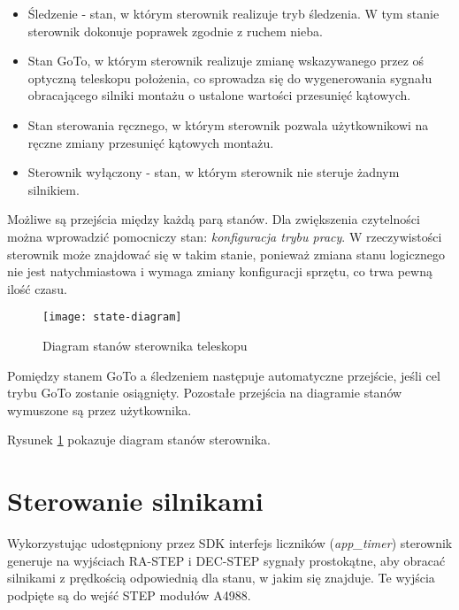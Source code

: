 \begin{itemize}

	\item Śledzenie - stan, w którym sterownik realizuje tryb śledzenia.
		W tym stanie sterownik dokonuje poprawek zgodnie z ruchem nieba.

	\item Stan GoTo, w którym sterownik realizuje zmianę wskazywanego przez
		oś optyczną teleskopu położenia, co sprowadza się do
		wygenerowania sygnału obracającego silniki montażu o ustalone
		wartości przesunięć kątowych.

	\item Stan sterowania ręcznego, w którym sterownik pozwala użytkownikowi
		na ręczne zmiany przesunięć kątowych montażu. 

	\item Sterownik wyłączony - stan, w którym sterownik nie steruje żadnym
		silnikiem.

\end{itemize}

Możliwe są przejścia między każdą parą stanów. Dla zwiększenia czytelności można
wprowadzić pomocniczy stan: \emph{konfiguracja trybu pracy}.  W rzeczywistości
sterownik może znajdować się w takim stanie, ponieważ zmiana stanu logicznego
nie jest natychmiastowa i wymaga zmiany konfiguracji sprzętu, co trwa pewną
ilość czasu.

\begin{figure}

	\texttt{[image: state-diagram]}

	\caption{Diagram stanów sterownika teleskopu}
	
	\label{rys:state-diagram}

\end{figure}

Pomiędzy stanem GoTo a śledzeniem następuje automatyczne przejście, jeśli cel
trybu GoTo zostanie osiągnięty. Pozostałe przejścia na diagramie stanów
wymuszone są przez użytkownika.

Rysunek \ref{rys:state-diagram} pokazuje diagram stanów sterownika.

\section{Sterowanie silnikami}

Wykorzystując udostępniony przez SDK interfejs liczników (\emph{app\_timer})
sterownik generuje na wyjściach RA-STEP i DEC-STEP sygnały prostokątne, aby
obracać silnikami z prędkością odpowiednią dla stanu, w jakim się znajduje. Te
wyjścia podpięte są do wejść STEP modułów A4988.

